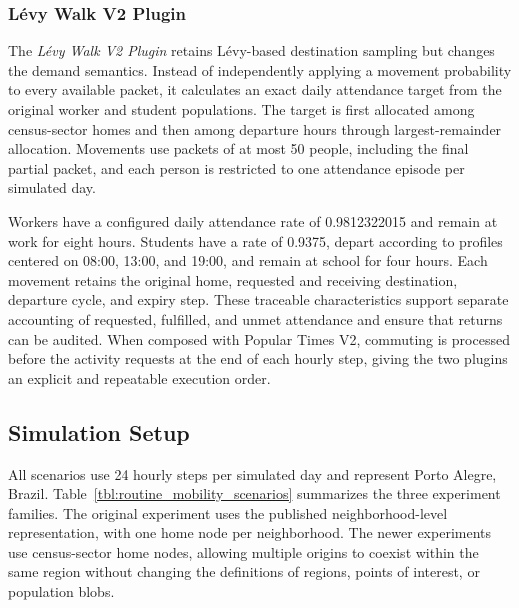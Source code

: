 \subsubsection{L\'evy Walk V2 Plugin}

The \textit{L\'evy Walk V2 Plugin} retains L\'evy-based destination sampling but changes the demand semantics. Instead of independently applying a movement probability to every available packet, it calculates an exact daily attendance target from the original worker and student populations. The target is first allocated among census-sector homes and then among departure hours through largest-remainder allocation. Movements use packets of at most 50 people, including the final partial packet, and each person is restricted to one attendance episode per simulated day.

Workers have a configured daily attendance rate of 0.9812322015 and remain at work for eight hours. Students have a rate of 0.9375, depart according to profiles centered on 08:00, 13:00, and 19:00, and remain at school for four hours. Each movement retains the original home, requested and receiving destination, departure cycle, and expiry step. These traceable characteristics support separate accounting of requested, fulfilled, and unmet attendance and ensure that returns can be audited. When composed with Popular Times V2, commuting is processed before the activity requests at the end of each hourly step, giving the two plugins an explicit and repeatable execution order.

\subsection{Simulation Setup}
\label{sec:routine_mobility_setup}

All scenarios use 24 hourly steps per simulated day and represent Porto Alegre, Brazil. Table~\ref{tbl:routine_mobility_scenarios} summarizes the three experiment families. The original experiment uses the published neighborhood-level representation, with one home node per neighborhood. The newer experiments use census-sector home nodes, allowing multiple origins to coexist within the same region without changing the definitions of regions, points of interest, or population blobs.

